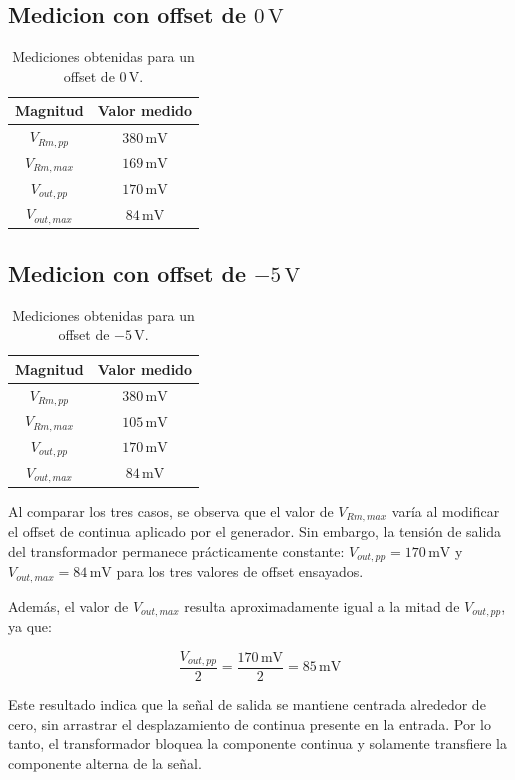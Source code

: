 \subsection{Medicion con offset de \(0\,\mathrm{V}\)}

\begin{table}[H]
\centering
\begin{tabular}{|c|c|}
\hline
Magnitud & Valor medido \\
\hline
\(V_{Rm,pp}\) & \(380\,\mathrm{mV}\) \\
\hline
\(V_{Rm,max}\) & \(169\,\mathrm{mV}\) \\
\hline
\(V_{out,pp}\) & \(170\,\mathrm{mV}\) \\
\hline
\(V_{out,max}\) & \(84\,\mathrm{mV}\) \\
\hline
\end{tabular}
\caption{Mediciones obtenidas para un offset de \(0\,\mathrm{V}\).}
\end{table}

\subsection{Medicion con offset de \(-5\,\mathrm{V}\)}

\begin{table}[H]
\centering
\begin{tabular}{|c|c|}
\hline
Magnitud & Valor medido \\
\hline
\(V_{Rm,pp}\) & \(380\,\mathrm{mV}\) \\
\hline
\(V_{Rm,max}\) & \(105\,\mathrm{mV}\) \\
\hline
\(V_{out,pp}\) & \(170\,\mathrm{mV}\) \\
\hline
\(V_{out,max}\) & \(84\,\mathrm{mV}\) \\
\hline
\end{tabular}
\caption{Mediciones obtenidas para un offset de \(-5\,\mathrm{V}\).}
\end{table}

Al comparar los tres casos, se observa que el valor de \(V_{Rm,max}\) var\'ia
al modificar el offset de continua aplicado por el generador. Sin embargo, la
tensi\'on de salida del transformador permanece pr\'acticamente constante:
\(V_{out,pp}=170\,\mathrm{mV}\) y \(V_{out,max}=84\,\mathrm{mV}\) para los tres
valores de offset ensayados.

Adem\'as, el valor de \(V_{out,max}\) resulta aproximadamente igual a la mitad
de \(V_{out,pp}\), ya que:

\[
\frac{V_{out,pp}}{2}=\frac{170\,\mathrm{mV}}{2}=85\,\mathrm{mV}
\]

Este resultado indica que la se\~nal de salida se mantiene centrada alrededor
de cero, sin arrastrar el desplazamiento de continua presente en la entrada.
Por lo tanto, el transformador bloquea la componente continua y solamente
transfiere la componente alterna de la se\~nal.

